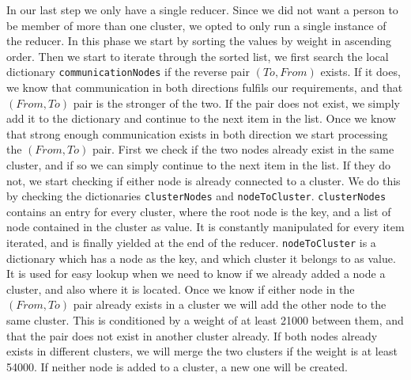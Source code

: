 \documentclass[runningheads,a4paper]{llncs}
\begin{document}
In our last step we only have a single reducer. Since we did not want a person to be member of more than one cluster, we opted to only run a single instance of the reducer. 
\newline
In this phase we start by sorting the values by weight in ascending order. Then we start to iterate through the sorted list, we first search the local dictionary \verb!communicationNodes! if the reverse pair $(To, From)$ exists. If it does, we know that communication in both directions fulfils our requirements, and that $(From, To)$ pair is the stronger of the two. If the pair does not exist, we simply add it to the dictionary and continue to the next item in the list.
\newline
Once we know that strong enough communication exists in both direction we start processing the $(From, To)$ pair. First we check if the two nodes already exist in the same cluster, and if so we can simply continue to the next item in the list. If they do not, we start checking if either node is already connected to a cluster. We do this by checking the dictionaries \verb!clusterNodes! and \verb!nodeToCluster!. \verb!clusterNodes! contains an entry for every cluster, where the root node is the key, and a list of node contained in the cluster as value. It is constantly manipulated for every item iterated, and is finally yielded at the end of the reducer. \verb!nodeToCluster! is a dictionary which has a node as the key, and which cluster it belongs to as value. It is used for easy lookup when we need to know if we already added a node a cluster, and also where it is located.
\newline
Once we know if either node in the $(From, To)$ pair already exists in a cluster we will add the other node to the same cluster. This is conditioned by a weight of at least 21000 between them, and that the pair does not exist in another cluster already. If both nodes already exists in different clusters, we will merge the two clusters if the weight is at least 54000. If neither node is added to a cluster, a new one will be created.
\newline
\end{document}
